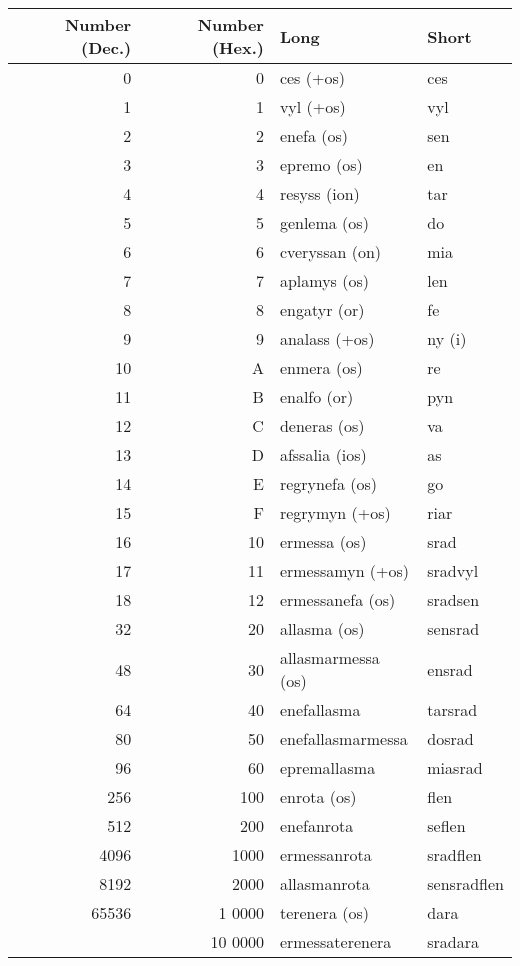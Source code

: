 \begin{center}
  \begin{tabular}{|r|r|l|l|}
    \hline
    \textbf{Number (Dec.)} & \textbf{Number (Hex.)} & \textbf{Long} & \textbf{Short} \\ \hline
    0 & 0 & ces (+os) & ces \\
    1 & 1 & vyl (+os) & vyl \\
    2 & 2 & enefa (os) & sen \\
    3 & 3 & epremo (os) & en \\
    4 & 4 & resyss (ion) & tar \\
    5 & 5 & genlema (os) & do \\
    6 & 6 & cveryssan (on) & mia \\
    7 & 7 & aplamys (os) & len \\
    8 & 8 & engatyr (or) & fe \\
    9 & 9 & analass (+os) & ny (i) \\
    10 & A & enmera (os) & re \\
    11 & B & enalfo (or) & pyn \\
    12 & C & deneras (os) & va \\
    13 & D & afssalia (ios) & as \\
    14 & E & regrynefa (os) & go \\
    15 & F & regrymyn (+os) & riar \\
    16 & 10 & ermessa (os) & srad \\
    17 & 11 & ermessamyn (+os) & sradvyl \\
    18 & 12 & ermessanefa (os) & sradsen \\
    32 & 20 & allasma (os) & sensrad \\
    48 & 30 & allasmarmessa (os) & ensrad \\
    64 & 40 & enefallasma & tarsrad \\
    80 & 50 & enefallasmarmessa & dosrad \\
    96 & 60 & epremallasma & miasrad \\
    256 & 100 & enrota (os) & flen \\
    512 & 200 & enefanrota & seflen \\
    4096 & 1000 & ermessanrota & sradflen \\
    8192 & 2000 & allasmanrota & sensradflen \\
    65536 & 1 0000 & terenera (os) & dara \\
    & 10 0000 & ermessaterenera & sradara \\

\end{tabular}
\end{center}
